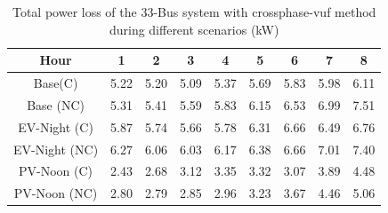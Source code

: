 \documentclass[journal]{IEEEtran}
\begin{document}
\begin{center}
\begin{table}
\caption{Total power loss of the 33-Bus system with crossphase-vuf method during different scenarios (kW)}
\label{Table7}
\centering
\setlength{\tabcolsep}{5.5pt}
\begin{tabular}{c|c|c|c|c|c|c|c|c}
    \hline\hline
    Hour & 1 & 2 & 3 & 4 & 5 & 6 & 7 & 8\\ \hline
    Base(C) & 5.22 & 5.20 & 5.09 & 5.37 & 5.69 & 5.83 & 5.98 & 6.11\\
    \hline
    \multirow{2}{3.5em}{Base (NC)} & \multirow{2}{*}{5.31} & \multirow{2}{*}{5.41} & \multirow{2}{*}{5.59} & \multirow{2}{*}{5.83} & \multirow{2}{*}{6.15} & \multirow{2}{*}{6.53} & \multirow{2}{*}{6.99} & \multirow{2}{*}{7.51}\\ & & & & & & & &\\
    \hline
   \multirow{2}{3.9em}{EV-Night (C)} & \multirow{2}{*}{5.87} & \multirow{2}{*}{5.74} & \multirow{2}{*}{5.66} & \multirow{2}{*}{5.78} & \multirow{2}{*}{6.31} & \multirow{2}{*}{6.66} & \multirow{2}{*}{6.49} & \multirow{2}{*}{6.76}\\ & & & & & & & &\\
    \hline
    \multirow{2}{3.9em}{EV-Night (NC)} & \multirow{2}{*}{6.27} & \multirow{2}{*}{6.06} & \multirow{2}{*}{6.03} & \multirow{2}{*}{6.17} & \multirow{2}{*}{6.38} & \multirow{2}{*}{6.66} & \multirow{2}{*}{7.01} & \multirow{2}{*}{7.40}\\ & & & & & & & &\\
    \hline
    \multirow{2}{3.9em}{PV-Noon (C)} & \multirow{2}{*}{2.43} & \multirow{2}{*}{2.68} & \multirow{2}{*}{3.12} & \multirow{2}{*}{3.35} & \multirow{2}{*}{3.32} & \multirow{2}{*}{3.07} & \multirow{2}{*}{3.89} & \multirow{2}{*}{4.48}\\ & & & & & & & &\\
    \hline
    \multirow{2}{3.9em}{PV-Noon (NC)}  & \multirow{2}{*}{2.80} & \multirow{2}{*}{2.79} & \multirow{2}{*}{2.85} & \multirow{2}{*}{2.96} & \multirow{2}{*}{3.23} & \multirow{2}{*}{3.67} & \multirow{2}{*}{4.46} & \multirow{2}{*}{5.06}\\ & & & & & & & &\\
    \hline\hline
    \end{tabular}

\end{table}
\end{center}

\end{document}
